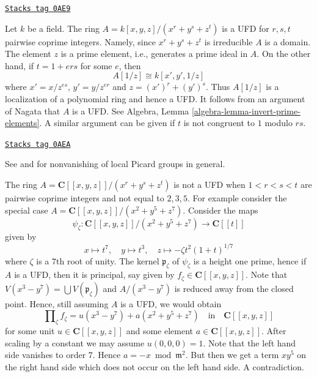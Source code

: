 \begin{example}[Factorial]
\label{spaces-resolve-example-factorial}
\href{https://stacks.math.columbia.edu/tag/0AE9}{\texttt{Stacks tag 0AE9}}

\begin{reference}
\cite[4(c)]{Samuel-UFD}
\end{reference}
Let $k$ be a field. The ring $A = k[x, y, z]/(x^r + y^s + z^t)$
is a UFD for $r, s, t$ pairwise coprime integers. Namely, since
$x^r + y^s + z^t$ is irreducible $A$ is a domain. The element $z$
is a prime element, i.e., generates a prime ideal in $A$.
On the other hand, if $t = 1 + ers$ for some $e$, then
$$
A[1/z] \cong k[x', y', 1/z]
$$
where $x' = x/z^{es}$, $y' = y/z^{er}$ and $z = (x')^r + (y')^s$.
Thus $A[1/z]$ is a localization of a polynomial ring and hence
a UFD. It follows from an argument of Nagata that $A$ is a UFD.
See Algebra, Lemma \ref{algebra-lemma-invert-prime-elements}.
A similar argument can be given if $t$ is not congruent to $1$
modulo $rs$.
\end{example}

\begin{example}
\label{spaces-resolve-example-completion-not-factorial}
\href{https://stacks.math.columbia.edu/tag/0AEA}{\texttt{Stacks tag 0AEA}}

\begin{reference}
See \cite{Brieskorn} and \cite{Lipman-rational} for nonvanishing of
local Picard groups in general.
\end{reference}
The ring $A = \mathbf{C}[[x, y, z]]/(x^r + y^s + z^t)$
is not a UFD when $1 < r < s < t$ are pairwise coprime integers
and not equal to $2, 3, 5$. For example consider the special
case $A = \mathbf{C}[[x, y, z]]/(x^2 + y^5 + z^7)$.
Consider the maps
$$
\psi_\zeta : \mathbf{C}[[x, y, z]]/(x^2 + y^5 + z^7) \to \mathbf{C}[[t]]
$$
given by
$$
x \mapsto t^7,\quad
y \mapsto t^3,\quad
z \mapsto -\zeta t^2(1 + t)^{1/7}
$$
where $\zeta$ is a $7$th root of unity. The kernel $\mathfrak p_\zeta$
of $\psi_\zeta$ is a height one prime, hence if $A$ is a UFD, then
it is principal, say given by $f_\zeta \in \mathbf{C}[[x, y, z]]$.
Note that $V(x^3 - y^7) = \bigcup V(\mathfrak p_\zeta)$
and $A/(x^3 - y^7)$ is reduced away from the closed point. Hence,
still assuming $A$ is a UFD, we would obtain
$$
\prod\nolimits_\zeta f_\zeta = u(x^3 - y^7) + a(x^2 + y^5 + z^7)
\quad\text{in}\quad
\mathbf{C}[[x, y, z]]
$$
for some unit $u \in \mathbf{C}[[x, y, z]]$ and some
element $a \in \mathbf{C}[[x, y, z]]$. After scaling by a constant
we may assume $u(0, 0, 0) = 1$. Note that the left hand side vanishes to
order $7$. Hence $a = - x \bmod \mathfrak m^2$. But then we get a term
$xy^5$ on the right hand side which does not occur on the left
hand side. A contradiction.
\end{example}

